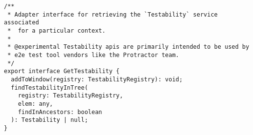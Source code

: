 \begin{verbatim}
/**
 * Adapter interface for retrieving the `Testability` service associated
 *  for a particular context.
 *
 * @experimental Testability apis are primarily intended to be used by
 * e2e test tool vendors like the Protractor team.
 */
export interface GetTestability {
  addToWindow(registry: TestabilityRegistry): void;
  findTestabilityInTree(
    registry: TestabilityRegistry,
    elem: any,
    findInAncestors: boolean
  ): Testability | null;
}
\end{verbatim}
